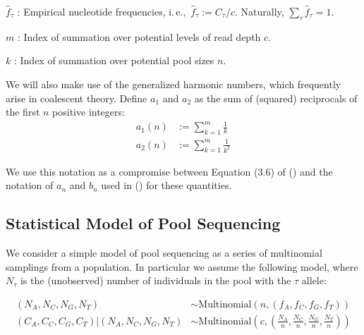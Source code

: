 \documentclass[letterpaper,fontsize=9pt,DIV=12]{scrartcl}
\newcommand\citeay[1]{\citeauthor{#1} (\citeyear{#1}) \cite{#1}}
\newcommand{\samplesize}{n}
\newcommand{\readdepth}{c}
\newcommand{\empfreq}{\widehat{f}}
\newcommand{\ie}{i.\,e.,~}
\begin{document}
$\empfreq_\tau$ :
Empirical nucleotide frequencies, \ie $\empfreq_\tau := C_\tau / \readdepth$. Naturally, $\sum_\tau \empfreq_\tau = 1$.


$m$ :
Index of summation over potential levels of read depth $\readdepth$.

$k$ :
Index of summation over potential pool sizes $\samplesize$.




We will also make use of the generalized harmonic numbers, which frequently arise in coalescent theory.  Define $a_1$ and $a_2$ as the sum of (squared) reciprocals of the first $n$ positive integers:
%
\begin{align}
    \label{eq:an}
    a_1(n) &:= \sum_{k=1}^{m} \frac{1}{k}
    \\
    \label{eq:bn}
    a_2(n) &:= \sum_{k=1}^{m} \frac{1}{k^2}
\end{align}
%


We use this notation as a compromise between Equation (3.6) of \citeay{Hahn2018} and the notation of $a_n$ and $b_n$ used in \citeay{Achaz2008} for these quantities.

\subsection{Statistical Model of Pool Sequencing}
\label{supp:sec:model}

We consider a simple model of pool sequencing as a series of multinomial samplings from a population.  In particular we assume the following model, where $N_\tau$ is the (unobserved) number of individuals in the pool with the $\tau$ allele:

\begin{align*}
(N_A, N_C, N_G, N_T) &\sim \text{Multinomial}\left(\samplesize, (f_A, f_C, f_G, f_T)\right)\\
(C_A, C_C, C_G, C_T) | (N_A, N_C, N_G, N_T) &\sim \text{Multinomial}\left(\readdepth, \left(\frac{N_A}{\samplesize}, \frac{N_C}{\samplesize},\frac{N_G}{\samplesize},\frac{N_T}{\samplesize}\right)\right)
\end{align*}
\end{document}
